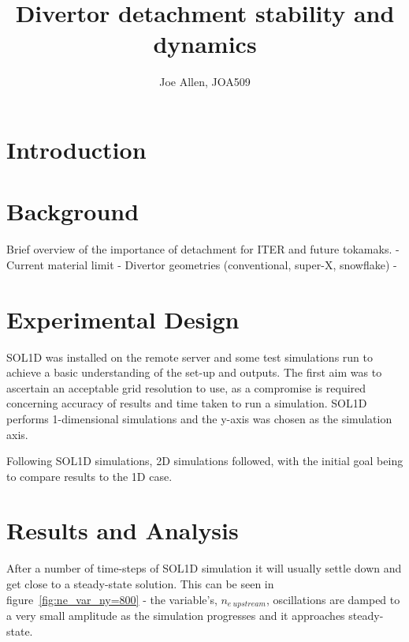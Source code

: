 \documentclass[11pt, twocolumn]{article}  %
\providecommand{\neus}{$n_{e~upstream}$} %
\begin{document}
\title{Divertor detachment stability and dynamics}
\author{Joe Allen, JOA509}



\section{Introduction}\label{sec:Intro}

\section{Background}\label{sec:Bg}
Brief overview of the importance of detachment for ITER and future tokamaks.
- Current material limit
- Divertor geometries (conventional, super-X, snowflake)
- 


\section{Experimental Design}\label{sec:Expt}
SOL1D was installed on the remote server and some test simulations run to achieve a basic understanding of the set-up and outputs. The first aim was to ascertain an acceptable grid resolution to use, as a compromise is required concerning accuracy of results and time taken to run a simulation. SOL1D performs 1-dimensional simulations and the y-axis was chosen as the simulation axis. 




Following SOL1D simulations, 2D simulations followed, with the initial goal being to compare results to the 1D case.


\section{Results and Analysis}\label{sec:Results}
After a number of time-steps of SOL1D simulation it will usually settle down and get close to a steady-state solution. This can be seen in figure~\ref{fig:ne_var_ny=800} - the variable's, \neus, oscillations are damped to a very small amplitude as the simulation progresses and it approaches steady-state.
\end{document}
